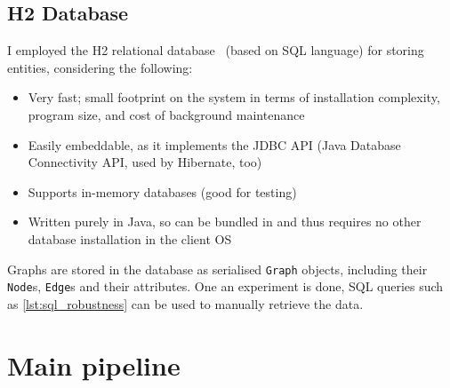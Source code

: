\subsection{H2 Database}

I employed the H2 relational database~\cite{MuellerH2DatabaseEngine2006} (based on SQL language) for storing entities, considering the following:
\begin{itemize}[topsep=5pt,itemsep=-2pt]
    \item Very fast; small footprint on the system in terms of installation complexity, program size, and cost of background maintenance
    \item Easily embeddable, as it implements the JDBC API (Java Database Connectivity API, used by Hibernate, too)
    \item Supports in-memory databases (good for testing)
    \item Written purely in Java, so can be bundled in \graffs and thus requires no other database installation in the client OS
\end{itemize}
Graphs are stored in the database as serialised \texttt{Graph} objects, including their \texttt{Node}s, \texttt{Edge}s and their attributes.
One an experiment is done, SQL queries such as \autoref{lst:sql_robustness} can be used to manually retrieve the data.




\section{Main pipeline}\label{sec:main_pipeline}

